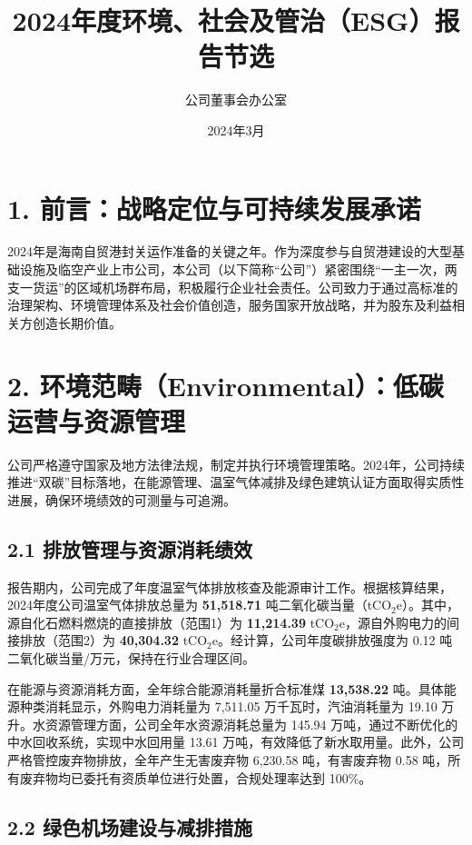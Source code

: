 \documentclass[a4paper,12pt]{article}
\title{\textbf{2024年度环境、社会及管治（ESG）报告节选}}
\author{公司董事会办公室}
\date{2024年3月}
\begin{document}
\maketitle


\section{1. 前言：战略定位与可持续发展承诺}

2024年是海南自贸港封关运作准备的关键之年。作为深度参与自贸港建设的大型基础设施及临空产业上市公司，本公司（以下简称“公司”）紧密围绕“一主一次，两支一货运”的区域机场群布局，积极履行企业社会责任。公司致力于通过高标准的治理架构、环境管理体系及社会价值创造，服务国家开放战略，并为股东及利益相关方创造长期价值。

\section{2. 环境范畴（Environmental）：低碳运营与资源管理}

公司严格遵守国家及地方法律法规，制定并执行环境管理策略。2024年，公司持续推进“双碳”目标落地，在能源管理、温室气体减排及绿色建筑认证方面取得实质性进展，确保环境绩效的可测量与可追溯。

\subsection{2.1 排放管理与资源消耗绩效}

报告期内，公司完成了年度温室气体排放核查及能源审计工作。根据核算结果，2024年度公司温室气体排放总量为 \textbf{51,518.71} 吨二氧化碳当量（tCO$_2$e）。其中，源自化石燃料燃烧的直接排放（范围1）为 \textbf{11,214.39} tCO$_2$e，源自外购电力的间接排放（范围2）为 \textbf{40,304.32} tCO$_2$e。经计算，公司年度碳排放强度为 0.12 吨二氧化碳当量/万元，保持在行业合理区间。

在能源与资源消耗方面，全年综合能源消耗量折合标准煤 \textbf{13,538.22} 吨。具体能源种类消耗显示，外购电力消耗量为 7,511.05 万千瓦时，汽油消耗量为 19.10 万升。水资源管理方面，公司全年水资源消耗总量为 145.94 万吨，通过不断优化的中水回收系统，实现中水回用量 13.61 万吨，有效降低了新水取用量。此外，公司严格管控废弃物排放，全年产生无害废弃物 6,230.58 吨，有害废弃物 0.58 吨，所有废弃物均已委托有资质单位进行处置，合规处理率达到 100\%。

\subsection{2.2 绿色机场建设与减排措施}
\end{document}
